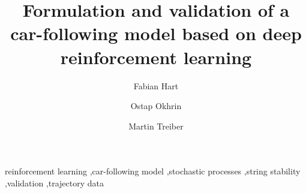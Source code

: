 \documentclass[review]{elsarticle}
\providecommand{\martinc}[1]{}                  %
\providecommand{\3}{{\ss}}
\begin{document}
\begin{frontmatter}

\title{Formulation and validation of a car-following model based on deep
  reinforcement learning}


\author[firstAddress]{Fabian Hart}
\author[firstAddress,secondAddress]{Ostap Okhrin}
\author[firstAddress,secondAddress]{Martin Treiber}

\address[firstAddress]{TU Dresden}
\address[secondAddress]{Possible second address}




\begin{abstract}
\martinc{After the final research has settled, I can write it}
\end{abstract}

\begin{keyword}
reinforcement learning \sep car-following model \sep stochastic
processes \sep string stability \sep validation \sep trajectory data 
\end{keyword}

\end{frontmatter}

\end{document}

